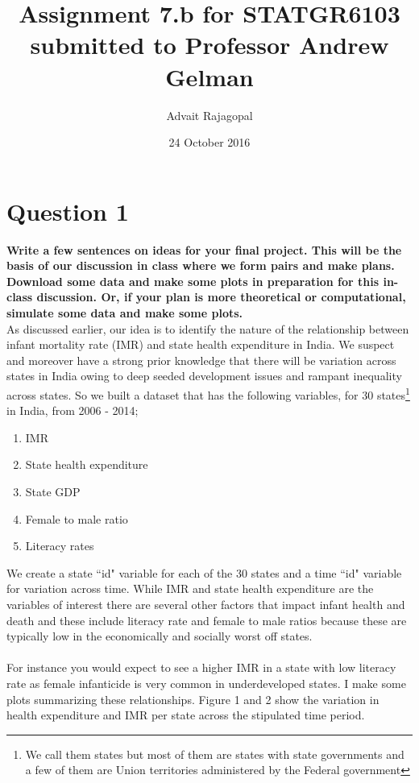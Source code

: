 \documentclass{article}
\title{Assignment 7.b for \textbf{STATGR6103}\\
\large submitted to Professor Andrew Gelman}
\date{24 October 2016}
\author{Advait Rajagopal}
\begin{document}
  \maketitle
\section{Question 1}
\textbf{Write a few sentences on ideas for your final project. This will be the basis of our discussion in class where we form pairs and make plans. Download some data and make some plots in preparation for this in-class discussion. Or, if your plan is more theoretical or computational, simulate some data and make some plots.}\\
As discussed earlier, our idea is to identify the nature of the relationship between infant mortality rate (IMR) and state health expenditure in India. We suspect and moreover have a strong prior knowledge that there will be variation across states in India owing to deep seeded development issues and rampant inequality across states. So we built a dataset that has the following variables, for 30 states\footnote{We call them states but most of them are states with state governments and a few of them are Union territories administered by the Federal government} in India, from 2006 - 2014;\\
\begin{enumerate}
\item{IMR}
\item{State health expenditure}
\item{State GDP}
\item{Female to male ratio}
\item{Literacy rates}
\end{enumerate}
We create a state ``id" variable for each of the 30 states and a time ``id" variable for variation across time. While IMR and state health expenditure are the variables of interest there are several other factors that impact infant health and death and these include literacy rate and female to male ratios because these are typically low in the economically and socially worst off states. \\
\\
For instance you would expect to see a higher IMR in a state with low literacy rate as female infanticide is very common in underdeveloped states. I make some plots summarizing these relationships. Figure 1 and 2 show the variation in health expenditure and IMR per state across the stipulated time period.
\end{document}

